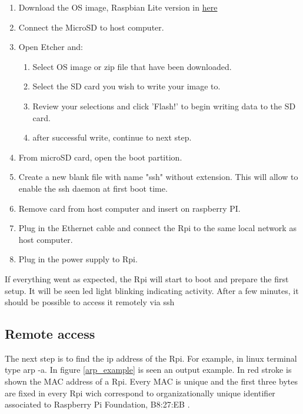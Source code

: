 \begin{enumerate}
	\item Download the OS image, Raspbian Lite version in \href{https://www.raspberrypi.org/downloads/raspbian/}{here}
	\item Connect the MicroSD to host computer.
	\item Open Etcher and:
	\begin{enumerate}
		\item Select OS image or zip file that have been downloaded.
		\item Select the SD card you wish to write your image to.
		\item Review your selections and click 'Flash!' to begin writing data to the SD card.
		\item after successful write, continue to next step.
	\end{enumerate}
	\item From microSD card, open the boot partition.
	\item Create a new blank file with name "ssh" without extension. This will allow to enable the ssh daemon at first boot time.
	\item Remove card from host computer and insert on raspberry PI.
	\item Plug in the Ethernet cable and connect the \gls{Rpi} to the same  local network as host computer.
	\item Plug in the power supply to \gls{Rpi}.
\end{enumerate}

If everything went as expected, the \gls{Rpi} will start to boot and prepare the first setup. It will be seen led light blinking indicating activity. After a few minutes, it should be possible to access it remotely via ssh


\subsection{Remote access}
The next step is to find the ip address of the \gls{Rpi}. For example, in linux terminal type \colorbox{gray!15}{arp -a}. In figure \ref{arp_example} is seen an output example. In red stroke is shown the \gls{MAC} address of a \gls{Rpi}. Every \gls{MAC} is unique and the first three bytes are fixed in every \gls{Rpi} wich correspond to organizationally unique identifier \cite{mac_wiki} associated to Raspberry Pi Foundation, B8:27:EB \cite{wireshark_mac}.


